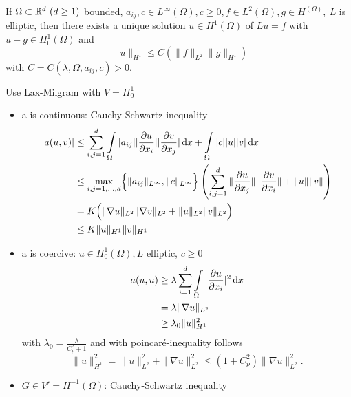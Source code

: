 \begin{enumerate}[=(\alph*)]
	\begin{thrm}
		If $\Omega \subset \mathbb{R}^d\ (d\geq1)$ bounded, $a_{ij},c \in L^\infty(\Omega), c\geq 0, f\in L^2(\Omega), g\in H^(\Omega),\ L$ is elliptic, then there exists a unique solution $u \in H^1(\Omega)$ of $Lu=f$ with  $u-g \in H^1_0(\Omega)$ and 
		\begin{equation*}
			\|u\|_{H^1} \leq C\left( \|f\|_{L^2} \|g\|_{H^1} \right)
		\end{equation*}  
		with $C = C(\lambda, \Omega,a_{ij},c)>0$.
	\end{thrm}

	\begin{proof_}
		Use Lax-Milgram with $V = H^1_0$
		\begin{itemize}
			\item a is continuous:\enter
			Cauchy-Schwartz inequality
			\begin{align*}
				|a(u,v)| &\leq \displaystyle \sum^d_{i,j=1} \int \limits_\Omega |a_{ij}| |\frac{\partial u}{\partial x_i}| |\frac{\partial v}{\partial x_j}| \mathop{}\!\mathrm{d} x + \int \limits_\Omega |c||u||v| \mathop{}\!\mathrm{d} x \\
				& \leq \underset{i,j = 1,\dots,d}{\max} \Big\{ \|a_{ij}\|_{L^\infty}, \|c\|_{L^\infty} \Big\}\left( \displaystyle \sum^d_{i,j=1} \|\frac{\partial u}{\partial x_j}\| \|\frac{\partial v}{\partial x_i}\| + \|u\|\|v\| \right)\\
				&= K \Big ( \|\nabla u\|_{L^2}\|\nabla v\|_{L^2} + \|u\|_{L^2}\|v\|_{L^2} \Big )\\
				&\leq K \|u\|_{H^1}\|v\|_{H^1}
			\end{align*}
			\item a is coercive: \enter
			$ u \in H^1_0(\Omega), L$ elliptic, $c \geq 0$
			\begin{align*}
				a(u,u) &\geq \lambda \displaystyle\sum^d_{i=1} \int \limits_\Omega |\frac{\partial u}{\partial x_i}|^2 \mathop{}\!\mathrm{d} x\\
					   &= \lambda\|\nabla u\|_{L^2}\\
					   &\geq \lambda_0 \|u\|^2_{H^1}
			\end{align*}
			with $\lambda_0 = \frac{\lambda}{C^2_p +1}$ and with poincaré-inequality follows
			\begin{equation*}
				\|u\|^2_{H^1} = \|u\|^2_{L^2} + \|\nabla u\|^2_{L^2} \leq \left( 1 + C^2_p \right)\|\nabla u\|^2_{L^2}.
			\end{equation*}
			\item $G \in V' = H^{-1}(\Omega)$:\enter
			Cauchy-Schwartz inequality
			\begin{align*}

\end{align*}
\end{itemize}
\end{proof_}
\end{enumerate}
